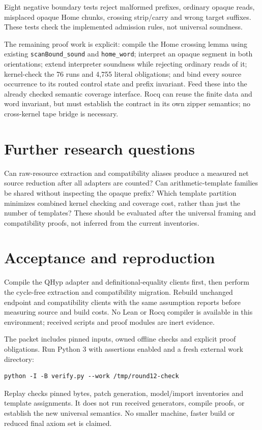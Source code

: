 \documentclass[11pt]{article}
\begin{document}
Eight negative boundary tests reject malformed prefixes, ordinary opaque reads, misplaced opaque Home chunks, crossing strip/carry and wrong target suffixes. These tests check the implemented admission rules, not universal soundness.

The remaining proof work is explicit: compile the Home crossing lemma using existing \texttt{scanBound\_sound} and \texttt{home\_word}; interpret an opaque segment in both orientations; extend interpreter soundness while rejecting ordinary reads of it; kernel-check the 76 runs and 4,755 literal obligations; and bind every source occurrence to its routed control state and prefix invariant. Feed these into the already checked semantic coverage interface. Rocq can reuse the finite data and word invariant, but must establish the contract in its own zipper semantics; no cross-kernel tape bridge is necessary.

\section{Further research questions}
Can raw-resource extraction and compatibility aliases produce a measured net source reduction after all adapters are counted? Can arithmetic-template families be shared without inspecting the opaque prefix? Which template partition minimizes combined kernel checking and coverage cost, rather than just the number of templates? These should be evaluated after the universal framing and compatibility proofs, not inferred from the current inventories.

\section{Acceptance and reproduction}
Compile the QHyp adapter and definitional-equality clients first, then perform the cycle-free extraction and compatibility migration. Rebuild unchanged endpoint and compatibility clients with the same assumption reports before measuring source and build costs. No Lean or Rocq compiler is available in this environment; received scripts and proof modules are inert evidence.

The packet includes pinned inputs, owned offline checks and explicit proof obligations. Run Python 3 with assertions enabled and a fresh external work directory:
\begin{verbatim}
python -I -B verify.py --work /tmp/round12-check
\end{verbatim}
Replay checks pinned bytes, patch generation, model/import inventories and template assignments. It does not run received generators, compile proofs, or establish the new universal semantics. No smaller machine, faster build or reduced final axiom set is claimed.
\end{document}
